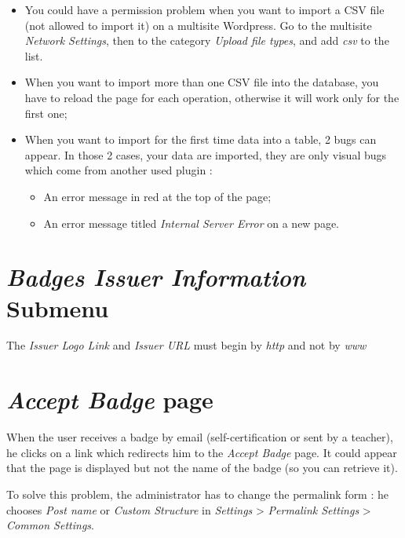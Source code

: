 \documentclass[a4paper, 12pt]{report}
\begin{document}
		\begin{itemize}
		
			\item You could have a permission problem when you want to import a CSV file (not allowed to import it) on a multisite Wordpress. Go to the multisite \textit{Network Settings}, then to the category \textit{Upload file types}, and add \textit{csv} to the list.

			\item When you want to import more than one CSV file into the database, you have to reload the page for each operation, otherwise it will work only for the first one;
			
			\item When you want to import for the first time data into a table, 2 bugs can appear. In those 2 cases, your data are imported, they are only visual bugs which come from another used plugin :
	 		\begin{itemize}
				\item An error message in red at the top of the page;
				\item An error message titled \textit{Internal Server Error} on a new page.
			\end{itemize}
			
		\end{itemize}
	

		\section{\textit{Badges Issuer Information} Submenu}
		
		The \textit{Issuer Logo Link} and \textit{Issuer URL} must begin by \textit{http} and not by \textit{www}
		
		\section{\textit{Accept Badge} page}
		
		When the user receives a badge by email (self-certification or sent by a teacher), he clicks on a link which redirects him to the \textit{Accept Badge} page. It could appear that the page is displayed but not the name of the badge (so you can retrieve it).
		
		To solve this problem, the administrator has to change the permalink form : he chooses \textit{Post name} or \textit{Custom Structure} in \textit{Settings} > \textit{Permalink Settings} > \textit{Common Settings}.
\end{document}
